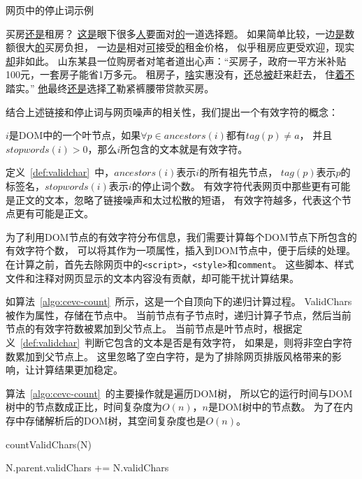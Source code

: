 \begin{example}
\label{ex:stopwords}
网页中的停止词示例
\end{example}
\begin{oframed}
买房\underline{还是}租房？
\underline{这是}眼下很多\underline{人}要面对\underline{的}一道选择题。
如果简单比较，一边\underline{是}数额很大\underline{的}买房负担，
一边\underline{是}相对\underline{可}接受\underline{的}租金价格，
似乎租房应更受欢迎，现实\underline{却}非如此。
山东某县一位购房者对笔者道出心声：“买房子，政府一平方米补贴100元，一套房子能省1万多元。
租房子，\underline{啥}实惠没有，\underline{还}总\underline{被}赶来赶去，
住\underline{着不}踏实。”
\underline{他}最终\underline{还是}选择\underline{了}勒紧裤腰带贷款买房。
\end{oframed}

结合上述链接和停止词与网页噪声的相关性，我们提出一个有效字符的概念：

\begin{definition}
\label{def:validchar}
$i$是DOM中的一个叶节点，如果$\forall p \in ancestors(i)$都有$tag(p) \neq a$，
并且$stopwords(i) > 0$，那么$i$所包含的文本就是有效字符。
\end{definition}

定义~\ref{def:validchar}~中，$ancestors(i)$表示$i$的所有祖先节点，
$tag(p)$表示$p$的标签名，$stopwords(i)$表示$i$的停止词个数。
有效字符代表网页中那些更有可能是正文的文本，忽略了链接噪声和太过松散的短语，
有效字符越多，代表这个节点更有可能是正文。

为了利用DOM节点的有效字符分布信息，我们需要计算每个DOM节点下所包含的有效字符个数，
可以将其作为一项属性，插入到DOM节点中，便于后续的处理。
在计算之前，首先去除网页中的\texttt{<script>}，\texttt{<style>}和\texttt{comment}。
这些脚本、样式文件和注释对网页显示的文本内容没有贡献，却可能干扰计算结果。

如算法~\ref{algo:cevc-count}~所示，这是一个自顶向下的递归计算过程。
ValidChars被作为属性，存储在节点中。
当前节点有子节点时，递归计算子节点，然后当前节点的有效字符数被累加到父节点上。
当前节点是叶节点时，根据定义~\ref{def:validchar}~判断它包含的文本是否是有效字符，
如果是，则将非空白字符数累加到父节点上。
这里忽略了空白字符，是为了排除网页排版风格带来的影响，让计算结果更加稳定。

算法~\ref{algo:cevc-count}~的主要操作就是遍历DOM树，
所以它的运行时间与DOM树中的节点数成正比，时间复杂度为$O(n)$，$n$是DOM树中的节点数。
为了在内存中存储解析后的DOM树，其空间复杂度也是$O(n)$。

\begin{algorithm}[htbp]
\caption{countValidChars(N)}
\label{algo:cevc-count}

 {
  N.parent.validChars += N.validChars \;
}{
}
\end{algorithm}

